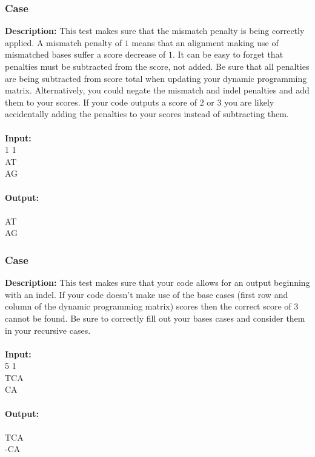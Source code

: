 \documentclass{article}
\newcommand{\code}[1]{{\fontfamily{pcr}\selectfont #1}}
\begin{document}
\subsubsection*{Case }
\hline \vspace{5}
\textbf{Description:} This test makes sure that the mismatch penalty is being correctly applied. A mismatch penalty of $1$ means that an alignment making use of mismatched bases suffer a score decrease of $1$. It can be easy to forget that penalties must be subtracted from the score, not added. Be sure that all penalties are being subtracted from score total when updating your dynamic programming matrix. Alternatively, you could negate the mismatch and indel penalties and add them to your scores. If your code outputs a score of $2$ or $3$ you are likely accidentally adding the penalties to your scores instead of subtracting them.\\ \\
\noindent \textbf{Input:}\\
\code{1 1 1\\AT\\AG}\\ \\
\noindent \textbf{Output:}\\
\code{0\\AT\\AG}

\subsubsection*{Case }
\hline \vspace{5}
\textbf{Description:} This test makes sure that your code allows for an output beginning with an indel. If your code doesn’t make use of the base cases (first row and column of the dynamic programming matrix) scores then the correct score of $3$ cannot be found. Be sure to correctly fill out your bases cases and consider them in your recursive cases.\\ \\
\noindent \textbf{Input:}\\
\code{2 5 1\\TCA\\CA}\\ \\
\noindent \textbf{Output:}\\
\code{3\\TCA\\-CA}
\pagebreak
\end{document}
